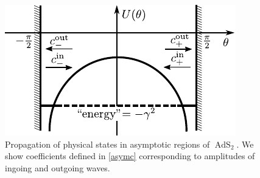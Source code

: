 \documentclass[12pt]{article}
\DeclareMathOperator{\tAdS}{\widetilde{AdS}}
\def\widetilde#1{#1}%
\begin{document}
\begin{figure}[t]
\centerline{
\includegraphics[scale=1.1]{prop} 
}
\caption{Propagation of physical states in asymptotic regions of $\tAdS_2$. We show coefficients defined in \eqref{asymc} corresponding to amplitudes of ingoing and outgoing waves.}
\label{fig:prop}
\end{figure}
\end{document}
